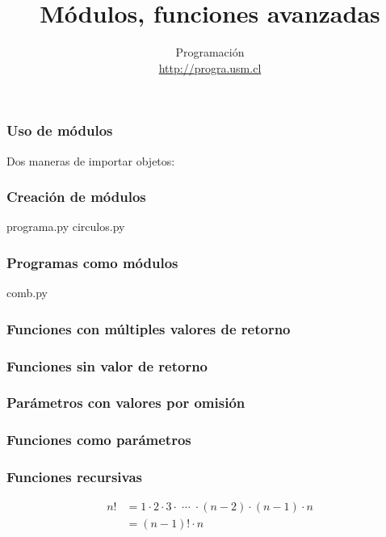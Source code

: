 \documentclass[12pt]{beamer}
\title{Módulos, funciones avanzadas}
\author{
  Programación \\ \url{http://progra.usm.cl}
}
\date{}
\begin{document}
  \begin{frame}
    \maketitle
  \end{frame}

  \begin{frame}
    \frametitle{Uso de módulos}
    \label{uso-modulos}
    Dos maneras de importar objetos:
    \vfill
    \footnotesize
    
    
  \end{frame}

  \begin{frame}
    \frametitle{Creación de módulos}
    \label{creacion-modulos}
    programa.py
    {\footnotesize
    }
    \vfill
    circulos.py
    {\footnotesize
    }
  \end{frame}

  \begin{frame}
    \frametitle{Programas como módulos}
    \label{programa-modulo}
    comb.py
    \footnotesize
    
  \end{frame}

  \begin{frame}
    \frametitle{Funciones con múltiples valores de retorno}
    \label{mult-retornos}
    
    
  \end{frame}

  \begin{frame}
    \frametitle{Funciones sin valor de retorno}
    \label{sin-retorno}
    \footnotesize
    
  \end{frame}

  \begin{frame}
    \frametitle{Parámetros con valores por omisión}
    \label{parametros-por-omision}
    
    
  \end{frame}

  \begin{frame}
    \frametitle{Funciones como parámetros}
    \label{func-parametros}
    \footnotesize
    
  \end{frame}

  \begin{frame}
    \frametitle{Funciones recursivas}
    \label{func-recursivas}
    \begin{align*}
        n! &= 1\cdot 2\cdot 3\cdot\;\cdots\;\cdot (n - 2)\cdot (n - 1)\cdot n \\
           &=  (n - 1)! \cdot n
    \end{align*}
    \vfill
    
  \end{frame}
\end{document}
